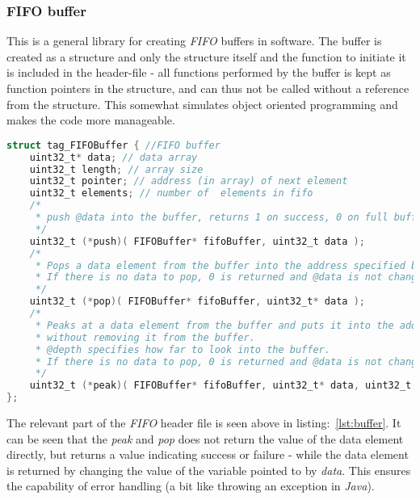 \subsubsection{FIFO buffer}
This is a general library for creating \emph{FIFO} buffers in software.
The buffer is created as a structure and only the structure itself and the
function to initiate it is included in the header-file - all functions performed
by the buffer is kept as function pointers in the structure, and can thus not be
called without a reference from the structure. This somewhat simulates object
oriented programming and makes the code more manageable.

\begin{lstlisting}[caption={Relevant part of FIFO.h}, language=C,
label=lst:buffer]
struct tag_FIFOBuffer { //FIFO buffer
	uint32_t* data; // data array
	uint32_t length; // array size
	uint32_t pointer; // address (in array) of next element
	uint32_t elements; // number of  elements in fifo
	/*
	 * push @data into the buffer, returns 1 on success, 0 on full buffer
	 */
	uint32_t (*push)( FIFOBuffer* fifoBuffer, uint32_t data );
	/*
	 * Pops a data element from the buffer into the address specified by the pointer @data.
	 * If there is no data to pop, 0 is returned and @data is not changed, else 1 is returned.
	 */
	uint32_t (*pop)( FIFOBuffer* fifoBuffer, uint32_t* data );
	/*
	 * Peaks at a data element from the buffer and puts it into the address specified by the pointer @data,
	 * without removing it from the buffer.
	 * @depth specifies how far to look into the buffer.
	 * If there is no data to pop, 0 is returned and @data is not changed, else 1 is returned.
	 */
	uint32_t (*peak)( FIFOBuffer* fifoBuffer, uint32_t* data, uint32_t depth ); // peak at the element depth into the stack (0 = top, 1 = just under top) - returns 1 if that element exists.
};
\end{lstlisting}

The  relevant part of the \emph{FIFO} header file is seen above in
listing:~\ref{lst:buffer}. It can be seen that the \emph{peak} and \emph{pop}
does not return the value of the data element directly, but returns a value
indicating success or failure - while the data element is returned by changing
the value of the variable pointed to by \emph{data}. This ensures the
capability of error handling (a bit like throwing an exception in \emph{Java}).


